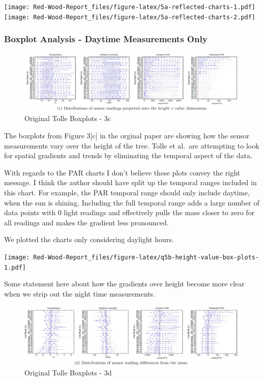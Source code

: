 \documentclass[
  twocolumn]{article}
\begin{document}
\texttt{[image: Red-Wood-Report\_files/figure-latex/5a-reflected-charts-1.pdf]}
\texttt{[image: Red-Wood-Report\_files/figure-latex/5a-reflected-charts-2.pdf]}

\hypertarget{boxplot-analysis---daytime-measurements-only}{%
\subsubsection{Boxplot Analysis - Daytime Measurements
Only}\label{boxplot-analysis---daytime-measurements-only}}

\begin{figure}
\centering
\includegraphics{./images/3c_plot_pic.JPG}
\caption{Original Tolle Boxplots - 3c}
\end{figure}

The boxplots from Figure 3{[}c{]} in the orginal paper are showing how
the sensor measurements vary over the height of the tree. Tolle et
al.~are attempting to look for spatial gradients and trends by
eliminating the temporal aspect of the data.

With regards to the PAR charts I don't believe these plots convey the
right message. I think the author should have split up the temporal
ranges included in this chart. For example, the PAR temporal range
should only include daytime, when the sun is shining. Including the full
temporal range adds a large number of data points with 0 light readings
and effectively pulls the mass closer to zero for all readings and makes
the gradient less pronounced.

We plotted the charts only considering daylight hours.

\texttt{[image: Red-Wood-Report\_files/figure-latex/q5b-height-value-box-plots-1.pdf]}

Some statement here about how the gradients over height become more
clear when we strip out the night time measurements.

\begin{figure}
\centering
\includegraphics{./images/3d_plot_pic.JPG}
\caption{Original Tolle Boxplots - 3d}
\end{figure}
\end{document}

